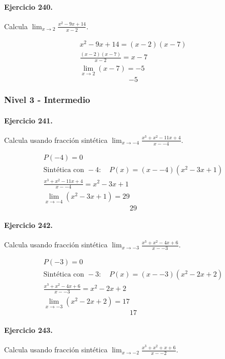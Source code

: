 \documentclass[11pt,a4paper]{article}
\begin{document}
\paragraph{Ejercicio 240.} Calcula $\displaystyle\lim_{x\to 2}\frac{x^2-9x+14}{x-2}$. 

\[
\begin{aligned}
x^2-9x+14=(x-2)(x-7)\\
\frac{(x-2)(x-7)}{x-2}=x-7\\
\lim_{x\to 2}(x-7)=-5
\end{aligned}
\]
\[\boxed{-5}\]


\newpage

\subsubsection*{Nivel 3 - Intermedio}

\paragraph{Ejercicio 241.} Calcula usando fracción sintética $\displaystyle\lim_{x\to -4}\frac{x^3 + x^2 - 11x + 4}{x--4}$. 

\[
\begin{aligned}
P(-4)=0\\
\text{Sintética con }-4:\quad P(x)=(x--4)(x^2 - 3x + 1)\\
\frac{x^3 + x^2 - 11x + 4}{x--4}=x^2 - 3x + 1\\
\lim_{x\to -4}(x^2 - 3x + 1)=29
\end{aligned}
\]
\[\boxed{29}\]


\paragraph{Ejercicio 242.} Calcula usando fracción sintética $\displaystyle\lim_{x\to -3}\frac{x^3 + x^2 - 4x + 6}{x--3}$. 

\[
\begin{aligned}
P(-3)=0\\
\text{Sintética con }-3:\quad P(x)=(x--3)(x^2 - 2x + 2)\\
\frac{x^3 + x^2 - 4x + 6}{x--3}=x^2 - 2x + 2\\
\lim_{x\to -3}(x^2 - 2x + 2)=17
\end{aligned}
\]
\[\boxed{17}\]


\paragraph{Ejercicio 243.} Calcula usando fracción sintética $\displaystyle\lim_{x\to -2}\frac{x^3 + x^2 + x + 6}{x--2}$. 
\end{document}
